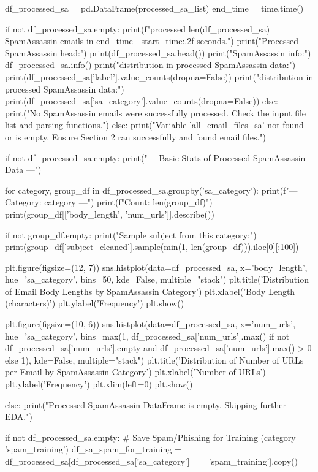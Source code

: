 \begin{ffcode}
    df_processed_sa = pd.DataFrame(processed_sa_list)
    end_time = time.time()

if not df_processed_sa.empty:
    print(f"\nSuccessfully processed {len(df_processed_sa)} SpamAssassin emails in {end_time - start_time:.2f} seconds.")
    print("Processed SpamAssassin head:")
    print(df_processed_sa.head())
    print("\nProcessed SpamAssassin info:")
    df_processed_sa.info()
    print("\nLabel distribution in processed SpamAssassin data:")
    print(df_processed_sa['label'].value_counts(dropna=False))
    print("\nCategory distribution in processed SpamAssassin data:")
    print(df_processed_sa['sa_category'].value_counts(dropna=False))
    else:
        print("No SpamAssassin emails were successfully processed. Check the input file list and parsing functions.")
else:
    print("Variable 'all_email_files_sa' not found or is empty. Ensure Section 2 ran successfully and found email files.")

    if not df_processed_sa.empty:
    print("--- Basic Stats of Processed SpamAssassin Data ---")

    for category, group_df in df_processed_sa.groupby('sa_category'):
        print(f"\n--- Category: {category} ---")
        print(f"Count: {len(group_df)}")
        print(group_df[['body_length', 'num_urls']].describe())

        if not group_df.empty:
            print("Sample subject from this category:")
            print(group_df['subject_cleaned'].sample(min(1, len(group_df))).iloc[0][:100])

    plt.figure(figsize=(12, 7))
    sns.histplot(data=df_processed_sa, x='body_length', hue='sa_category', bins=50, kde=False, multiple="stack")
    plt.title('Distribution of Email Body Lengths by SpamAssassin Category')
    plt.xlabel('Body Length (characters)')
    plt.ylabel('Frequency')
    plt.show()

    plt.figure(figsize=(10, 6))
    sns.histplot(data=df_processed_sa, x='num_urls', hue='sa_category', bins=max(1, df_processed_sa['num_urls'].max() if not df_processed_sa['num_urls'].empty and df_processed_sa['num_urls'].max() > 0 else 1), kde=False, multiple="stack")
    plt.title('Distribution of Number of URLs per Email by SpamAssassin Category')
    plt.xlabel('Number of URLs')
    plt.ylabel('Frequency')
    plt.xlim(left=0)
    plt.show()

else:
    print("Processed SpamAssassin DataFrame is empty. Skipping further EDA.")

if not df_processed_sa.empty:
    # Save Spam/Phishing for Training (category 'spam_training')
    df_sa_spam_for_training = df_processed_sa[df_processed_sa['sa_category'] == 'spam_training'].copy()


\end{ffcode}
